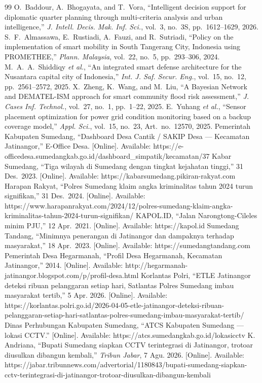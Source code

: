 \documentclass[10pt,twocolumn,a4paper]{article}
\begin{document}
\begin{thebibliography}{99}
 O.\ Baddour, A.\ Bhogayata, and T.\ Vora, ``Intelligent decision support for diplomatic quarter planning through multi-criteria analysis and urban intelligence,'' \textit{J. Intell. Decis. Mak. Inf. Sci.}, vol.\ 3, no.\ 3S, pp.\ 1612--1629, 2026.
 S.\ F.\ Almassawa, E.\ Rustiadi, A.\ Fauzi, and R.\ Sutriadi, ``Policy on the implementation of smart mobility in South Tangerang City, Indonesia using PROMETHEE,'' \textit{Plann. Malaysia}, vol.\ 22, no.\ 5, pp.\ 293--306, 2024.
 M.\ A.\ A.\ Shiddiqy \textit{et al.}, ``An integrated smart defense architecture for the Nusantara capital city of Indonesia,'' \textit{Int. J. Saf. Secur. Eng.}, vol.\ 15, no.\ 12, pp.\ 2561--2572, 2025.
 X.\ Zheng, K.\ Wang, and M.\ Liu, ``A Bayesian Network and DEMATEL-ISM approach for smart community flood risk assessment,'' \textit{J. Cases Inf. Technol.}, vol.\ 27, no.\ 1, pp.\ 1--22, 2025.
 E.\ Yuhang \textit{et al.}, ``Sensor placement optimization for power grid condition monitoring based on a backup coverage model,'' \textit{Appl. Sci.}, vol.\ 15, no.\ 23, Art.\ no.\ 12570, 2025.
 Pemerintah Kabupaten Sumedang, ``Dashboard Desa Cantik / SAKIP Desa --- Kecamatan Jatinangor,'' E-Office Desa. [Online]. Available: https://e-officedesa.sumedangkab.go.id/dashboard\_simpatik/kecamatan/37
 Kabar Sumedang, ``Tiga wilayah di Sumedang dengan tingkat kejahatan tinggi,'' 31 Des.\ 2023. [Online]. Available: https://kabarsumedang.pikiran-rakyat.com
 Harapan Rakyat, ``Polres Sumedang klaim angka kriminalitas tahun 2024 turun signifikan,'' 31 Des.\ 2024. [Online]. Available: https://www.harapanrakyat.com/2024/12/polres-sumedang-klaim-angka-kriminalitas-tahun-2024-turun-signifikan/
 KAPOL.ID, ``Jalan Narongtong-Cileles minim PJU,'' 12 Apr.\ 2021. [Online]. Available: https://kapol.id
 Sumedang Tandang, ``Minimnya penerangan di Jatinangor dan dampaknya terhadap masyarakat,'' 18 Apr.\ 2023. [Online]. Available: https://sumedangtandang.com
 Pemerintah Desa Hegarmanah, ``Profil Desa Hegarmanah, Kecamatan Jatinangor,'' 2014. [Online]. Available: http://hegarmanah-jatinangor.blogspot.com/p/profil-desa.html
 Korlantas Polri, ``ETLE Jatinangor deteksi ribuan pelanggaran setiap hari, Satlantas Polres Sumedang imbau masyarakat tertib,'' 5 Apr. 2026. [Online]. Available: https://korlantas.polri.go.id/2026-04-05-etle-jatinangor-deteksi-ribuan-pelanggaran-setiap-hari-satlantas-polres-sumedang-imbau-masyarakat-tertib/
 Dinas Perhubungan Kabupaten Sumedang, ``ATCS Kabupaten Sumedang --- lokasi CCTV.'' [Online]. Available: https://atcs.sumedangkab.go.id/lokasicctv
 K. Andriana, ``Bupati Sumedang siapkan CCTV terintegrasi di Jatinangor, trotoar diusulkan dibangun kembali,'' \textit{Tribun Jabar}, 7 Agu. 2026. [Online]. Available: https://jabar.tribunnews.com/advertorial/1180843/bupati-sumedang-siapkan-cctv-terintegrasi-di-jatinangor-trotoar-diusulkan-dibangun-kembali
\end{thebibliography}
\end{document}
